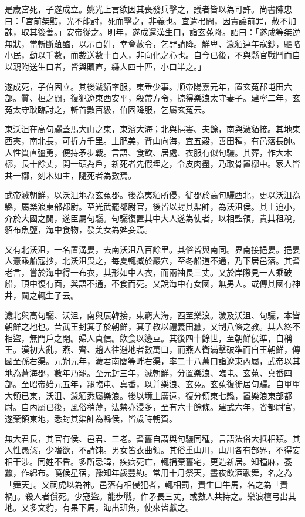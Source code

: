 \begin{pinyinscope}
是歲宮死，子遂成立。姚光上言欲因其喪發兵擊之，議者皆以為可許。尚書陳忠曰：「宮前桀黠，光不能討，死而擊之，非義也。宜遣弔問，因責讓前罪，赦不加誅，取其後善。」安帝從之。明年，遂成還漢生口，詣玄菟降。詔曰：「遂成等桀逆無狀，當斬斷葅醢，以示百姓，幸會赦令，乞罪請降。鮮卑、濊貊連年寇鈔，驅略小民，動以千數，而裁送數十百人，非向化之心也。自今已後，不與縣官戰鬥而自以親附送生口者，皆與贖直，縑人四十匹，小口半之。」

遂成死，子伯固立。其後濊貊率服，東垂少事。順帝陽嘉元年，置玄菟郡屯田六部。質、桓之閒，復犯遼東西安平，殺帶方令，掠得樂浪太守妻子。建寧二年，玄菟太守耿臨討之，斬首數百級，伯固降服，乞屬玄菟云。

東沃沮在高句驪蓋馬大山之東，東濱大海；北與挹婁、夫餘，南與濊貊接。其地東西夾，南北長，可折方千里。土肥美，背山向海，宜五穀，善田種，有邑落長帥。人性質直彊勇，便持矛步戰。言語、食飲、居處、衣服有似句驪。其葬，作大木槨，長十餘丈，開一頭為戶，新死者先假埋之，令皮肉盡，乃取骨置槨中。家人皆共一槨，刻木如主，隨死者為數焉。

武帝滅朝鮮，以沃沮地為玄菟郡。後為夷貊所侵，徙郡於高句驪西北，更以沃沮為縣，屬樂浪東部都尉。至光武罷都尉官，後皆以封其渠帥，為沃沮侯。其土迫小，介於大國之閒，遂臣屬句驪。句驪復置其中大人遂為使者，以相監領，貴其租稅，貂布魚鹽，海中食物，發美女為婢妾焉。

又有北沃沮，一名置溝婁，去南沃沮八百餘里。其俗皆與南同。界南接挹婁。挹婁人憙乘船寇抄，北沃沮畏之，每夏輒臧於巖穴，至冬船道不通，乃下居邑落。其耆老言，嘗於海中得一布衣，其形如中人衣，而兩袖長三丈。又於岸際見一人乘破船，頂中復有面，與語不通，不食而死。又說海中有女國，無男人。或傳其國有神井，闚之輒生子云。

濊北與高句驪、沃沮，南與辰韓接，東窮大海，西至樂浪。濊及沃沮、句驪，本皆朝鮮之地也。昔武王封箕子於朝鮮，箕子教以禮義田蠶，又制八條之教。其人終不相盜，無門戶之閉。婦人貞信。飲食以籩豆。其後四十餘世，至朝鮮侯準，自稱王。漢初大亂，燕、齊、趙人往避地者數萬口，而燕人衛滿擊破準而自王朝鮮，傳國至孫右渠。元朔元年，濊君南閭等畔右渠，率二十八萬口詣遼東內屬，武帝以其地為蒼海郡，數年乃罷。至元封三年，滅朝鮮，分置樂浪、臨屯、玄菟、真番四部。至昭帝始元五年，罷臨屯、真番，以并樂浪、玄菟。玄菟復徙居句驪。自單單大領已東，沃沮、濊貊悉屬樂浪。後以境土廣遠，復分領東七縣，置樂浪東部都尉。自內屬已後，風俗稍薄，法禁亦浸多，至有六十餘條。建武六年，省都尉官，遂棄領東地，悉封其渠帥為縣侯，皆歲時朝賀。

無大君長，其官有侯、邑君、三老。耆舊自謂與句驪同種，言語法俗大抵相類。其人性愚愨，少嗜欲，不請饨。男女皆衣曲領。其俗重山川，山川各有部界，不得妄相干涉。同姓不昏。多所忌諱，疾病死亡，輒捐棄舊宅，更造新居。知種麻，養蠶，作綿布。曉候星宿，豫知年歲豐約。常用十月祭天，晝夜飲酒歌舞，名之為「舞天」。又祠虎以為神。邑落有相侵犯者，輒相罰，責生口牛馬，名之為「責禍」。殺人者償死。少寇盜。能步戰，作矛長三丈，或數人共持之。樂浪檀弓出其地。又多文豹，有果下馬，海出班魚，使來皆獻之。


\end{pinyinscope}
